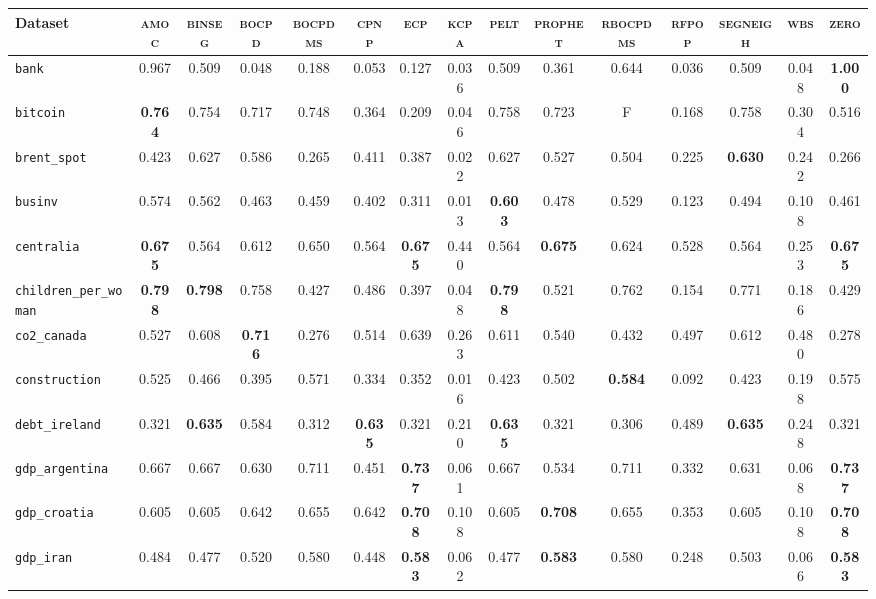 \begin{tabular}{lcccccccccccccc}
Dataset & \textsc{amoc} & \textsc{binseg} & \textsc{bocpd} & \textsc{bocpdms} & \textsc{cpnp} & \textsc{ecp} & \textsc{kcpa} & \textsc{pelt} & \textsc{prophet} & \textsc{rbocpdms} & \textsc{rfpop} & \textsc{segneigh} & \textsc{wbs} & \textsc{zero}\\
\toprule
\verb+bank+ & 0.967 & 0.509 & 0.048 & 0.188 & 0.053 & 0.127 & 0.036 & 0.509 & 0.361 & 0.644 & 0.036 & 0.509 & 0.048 & \textbf{1.000}\\
\verb+bitcoin+ & \textbf{0.764} & 0.754 & 0.717 & 0.748 & 0.364 & 0.209 & 0.046 & 0.758 & 0.723 & F & 0.168 & 0.758 & 0.304 & 0.516\\
\verb+brent_spot+ & 0.423 & 0.627 & 0.586 & 0.265 & 0.411 & 0.387 & 0.022 & 0.627 & 0.527 & 0.504 & 0.225 & \textbf{0.630} & 0.242 & 0.266\\
\verb+businv+ & 0.574 & 0.562 & 0.463 & 0.459 & 0.402 & 0.311 & 0.013 & \textbf{0.603} & 0.478 & 0.529 & 0.123 & 0.494 & 0.108 & 0.461\\
\verb+centralia+ & \textbf{0.675} & 0.564 & 0.612 & 0.650 & 0.564 & \textbf{0.675} & 0.440 & 0.564 & \textbf{0.675} & 0.624 & 0.528 & 0.564 & 0.253 & \textbf{0.675}\\
\verb+children_per_woman+ & \textbf{0.798} & \textbf{0.798} & 0.758 & 0.427 & 0.486 & 0.397 & 0.048 & \textbf{0.798} & 0.521 & 0.762 & 0.154 & 0.771 & 0.186 & 0.429\\
\verb+co2_canada+ & 0.527 & 0.608 & \textbf{0.716} & 0.276 & 0.514 & 0.639 & 0.263 & 0.611 & 0.540 & 0.432 & 0.497 & 0.612 & 0.480 & 0.278\\
\verb+construction+ & 0.525 & 0.466 & 0.395 & 0.571 & 0.334 & 0.352 & 0.016 & 0.423 & 0.502 & \textbf{0.584} & 0.092 & 0.423 & 0.198 & 0.575\\
\verb+debt_ireland+ & 0.321 & \textbf{0.635} & 0.584 & 0.312 & \textbf{0.635} & 0.321 & 0.210 & \textbf{0.635} & 0.321 & 0.306 & 0.489 & \textbf{0.635} & 0.248 & 0.321\\
\verb+gdp_argentina+ & 0.667 & 0.667 & 0.630 & 0.711 & 0.451 & \textbf{0.737} & 0.061 & 0.667 & 0.534 & 0.711 & 0.332 & 0.631 & 0.068 & \textbf{0.737}\\
\verb+gdp_croatia+ & 0.605 & 0.605 & 0.642 & 0.655 & 0.642 & \textbf{0.708} & 0.108 & 0.605 & \textbf{0.708} & 0.655 & 0.353 & 0.605 & 0.108 & \textbf{0.708}\\
\verb+gdp_iran+ & 0.484 & 0.477 & 0.520 & 0.580 & 0.448 & \textbf{0.583} & 0.062 & 0.477 & \textbf{0.583} & 0.580 & 0.248 & 0.503 & 0.066 & \textbf{0.583}\\

\end{tabular}
